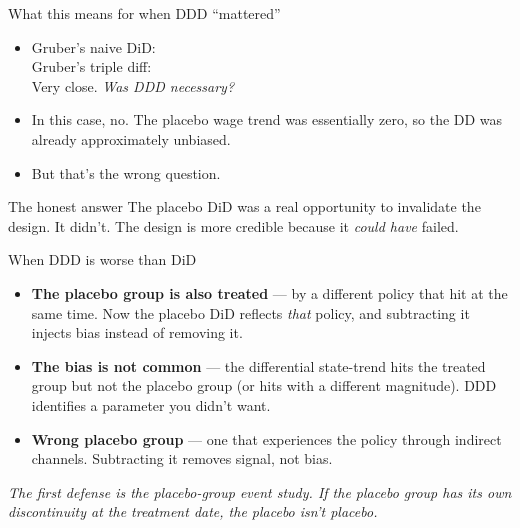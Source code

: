 \documentclass[aspectratio=169,11pt]{beamer}
\begin{document}
\begin{frame}{What this means for when DDD ``mattered''}
\vspace{0.5em}
\begin{itemize}
  \item Gruber's naive DiD: \;\;\; \\
        Gruber's triple diff:  \\
        Very close. \;\textit{Was DDD necessary?}
  \item In this case, no. The placebo wage trend was essentially zero, so the DD was already approximately unbiased.
  \item But that's the wrong question.
\end{itemize}
\vspace{0.5em}
\begin{block}{The honest answer}
\small
{} \;The placebo DiD was a real opportunity to invalidate the design. It didn't. The design is more credible because it \textit{could have} failed.
\end{block}
\vspace{0.2em}
\end{frame}

\begin{frame}{When DDD is worse than DiD}
\vspace{0.4em}
\begin{itemize}\small
  \item \textbf{The placebo group is also treated} --- by a different policy that hit at the same time. Now the placebo DiD reflects \textit{that} policy, and subtracting it injects bias instead of removing it.
  \item \textbf{The bias is not common} --- the differential state-trend hits the treated group but not the placebo group (or hits with a different magnitude). DDD identifies a parameter you didn't want.
  \item \textbf{Wrong placebo group} --- one that experiences the policy through indirect channels. Subtracting it removes signal, not bias.
\end{itemize}
\vspace{0.5em}
\begin{center}
\small\color{warmgray}\itshape
The first defense is the placebo-group event study. If the placebo group has its own discontinuity at the treatment date, the placebo isn't placebo.
\end{center}
\end{frame}
\end{document}
